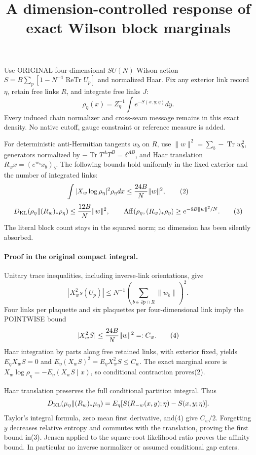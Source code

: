 \documentclass{article}
\title{A dimension-controlled response of exact Wilson block marginals}\author{}\date{}
\begin{document}
\maketitle
Use ORIGINAL four-dimensional $SU(N)$ Wilson action
$S=B\sum_p[1-N^{-1}\operatorname{ReTr}U_p]$ and normalized Haar.
Fix any exterior link record $\eta$, retain free links $R$, and integrate free links $J$:
\[
 \rho_\eta(x)=Z_\eta^{-1}\int e^{-S(x,y;\eta)}dy. \tag{1}
\]
Every induced chain normalizer and cross-seam message remains in this exact density.
No native cutoff, gauge constraint or reference measure is added.

For deterministic anti-Hermitian tangents $w_b$ on $R$, use
$\|w\|^2=\sum_b-\operatorname{Tr}w_b^2$, generators normalized by
$-\operatorname{Tr}T^AT^B=\delta^{AB}$, and Haar translation
$R_wx=(e^{w_b}x_b)_b$. The following bounds hold uniformly in the fixed exterior and the number of integrated links:
\[
 \int |X_w\log\rho_\eta|^2\rho_\eta dx\le {24B\over N}\|w\|^2, \tag{2}
\]
\[
 D_{\rm KL}(\rho_\eta\Vert(R_w)_*\rho_\eta)
       \le {12B\over N}\|w\|^2,\qquad
 \operatorname{Aff}(\rho_\eta,(R_w)_*\rho_\eta)
       \ge e^{-6B\|w\|^2/N}. \tag{3}
\]
The literal block count stays in the squared norm; no dimension has been silently absorbed.

\paragraph{Proof in the original compact integral.}
Unitary trace inequalities, including inverse-link orientations, give
\[
 |X_w^2s(U_p)|\le N^{-1}
       \left(\sum_{b\in\partial p\cap R}\|w_b\|\right)^2.
\]
Four links per plaquette and six plaquettes per four-dimensional link imply the POINTWISE bound
\[
 |X_w^2S|\le {24B\over N}\|w\|^2=:C_w. \tag{4}
\]
Haar integration by parts along free retained links, with exterior fixed, yields
$E_\eta X_wS=0$ and $E_\eta(X_wS)^2=E_\eta X_w^2S\le C_w$.
The exact marginal score is
$X_w\log\rho_\eta=-E_\eta(X_wS\mid x)$, so conditional contraction proves(2).

Haar translation preserves the full conditional partition integral. Thus
\[
 D_{\rm KL}(\mu_\eta\Vert(R_w)_*\mu_\eta)
 =E_\eta[S(R_{-w}(x,y);\eta)-S(x,y;\eta)].
\]
Taylor's integral formula, zero mean first derivative, and(4) give $C_w/2$.
Forgetting $y$ decreases relative entropy and commutes with the translation, proving the first bound in(3). Jensen applied to the square-root likelihood ratio proves the affinity bound. In particular no inverse normalizer or assumed conditional gap enters.
\end{document}
